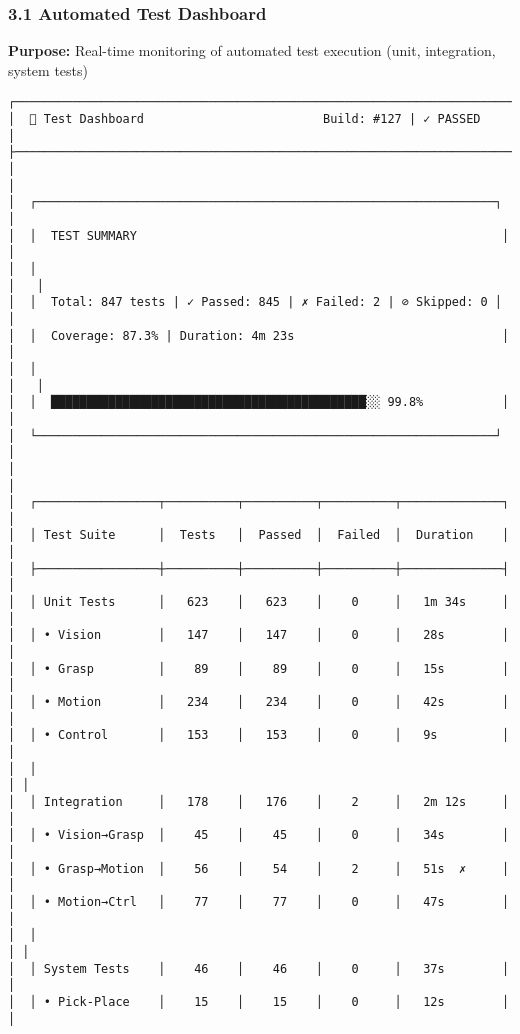 \documentclass[
]{article}
\begin{document}
\hypertarget{automated-test-dashboard}{%
\subsubsection{3.1 Automated Test
Dashboard}\label{automated-test-dashboard}}

\textbf{Purpose:} Real-time monitoring of automated test execution
(unit, integration, system tests)

\begin{verbatim}
┌────────────────────────────────────────────────────────────────────────┐
│  🧪 Test Dashboard                         Build: #127 | ✓ PASSED      │
├────────────────────────────────────────────────────────────────────────┤
│                                                                        │
│  ┌────────────────────────────────────────────────────────────────┐   │
│  │  TEST SUMMARY                                                   │   │
│  │                                                                  │   │
│  │  Total: 847 tests | ✓ Passed: 845 | ✗ Failed: 2 | ⊘ Skipped: 0 │   │
│  │  Coverage: 87.3% | Duration: 4m 23s                             │   │
│  │                                                                  │   │
│  │  ████████████████████████████████████████████░░ 99.8%           │   │
│  └────────────────────────────────────────────────────────────────┘   │
│                                                                        │
│  ┌─────────────────┬──────────┬──────────┬──────────┬──────────────┐ │
│  │ Test Suite      │  Tests   │  Passed  │  Failed  │  Duration    │ │
│  ├─────────────────┼──────────┼──────────┼──────────┼──────────────┤ │
│  │ Unit Tests      │   623    │   623    │    0     │   1m 34s     │ │
│  │ • Vision        │   147    │   147    │    0     │   28s        │ │
│  │ • Grasp         │    89    │    89    │    0     │   15s        │ │
│  │ • Motion        │   234    │   234    │    0     │   42s        │ │
│  │ • Control       │   153    │   153    │    0     │   9s         │ │
│  │                                                                  │ │
│  │ Integration     │   178    │   176    │    2     │   2m 12s     │ │
│  │ • Vision→Grasp  │    45    │    45    │    0     │   34s        │ │
│  │ • Grasp→Motion  │    56    │    54    │    2     │   51s  ✗     │ │
│  │ • Motion→Ctrl   │    77    │    77    │    0     │   47s        │ │
│  │                                                                  │ │
│  │ System Tests    │    46    │    46    │    0     │   37s        │ │
│  │ • Pick-Place    │    15    │    15    │    0     │   12s        │ │

\end{verbatim}
\end{document}

